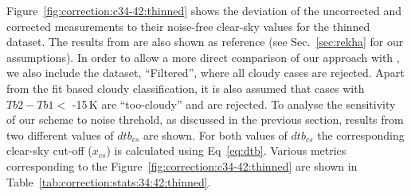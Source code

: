 \documentclass[12pt]{article}
\begin{document}
Figure~\ref{fig:correction:c34-42:thinned} shows the deviation of the uncorrected and
corrected measurements to their noise-free clear-sky values for the thinned dataset. The results from
\cite{rekha2012potential} are also shown as reference (see Sec.~\ref{sec:rekha}
for our assumptions). In order to allow a more direct comparison of our
approach with \cite{rekha2012potential}, we also include the
dataset, ``Filtered'', where all cloudy cases are rejected. Apart from the fit
based cloudy classification, it is also assumed that cases with $Tb2-Tb1 < $
-15\,K are ``too-cloudy'' and are rejected.  To analyse the sensitivity of our scheme to noise threhold, as discussed in the previous section, results from two different values of $dtb_{cs}$ are shown. For both values of $dtb_{cs}$ the corresponding clear-sky cut-off
($x_{cs}$) is calculated using Eq~\ref{eq:dtb}. Various metrics corresponding to
the Figure~\ref{fig:correction:c34-42:thinned} are shown in
Table~\ref{tab:correction:stats:34:42:thinned}.
\end{document}
